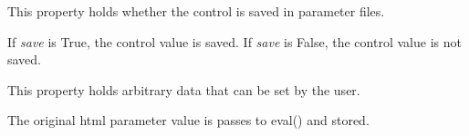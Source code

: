 \documentclass[letterpaper,10pt,english]{sphinxmanual}
\begin{document}
\begin{fulllineitems}
\begin{fulllineitems}
\end{fulllineitems}


\begin{fulllineitems}
\label{api:controls.FileDialog.save}
This property holds whether the control is saved in parameter files.

If \emph{save} is True, the control value is saved.
If \emph{save} is False, the control value is not saved.

\end{fulllineitems}


\begin{fulllineitems}
\label{api:controls.FileDialog.user}
This property holds arbitrary data that can be set by the user.

The original html parameter value is passes to eval() and stored.

\end{fulllineitems}


\end{fulllineitems}

\end{document}

